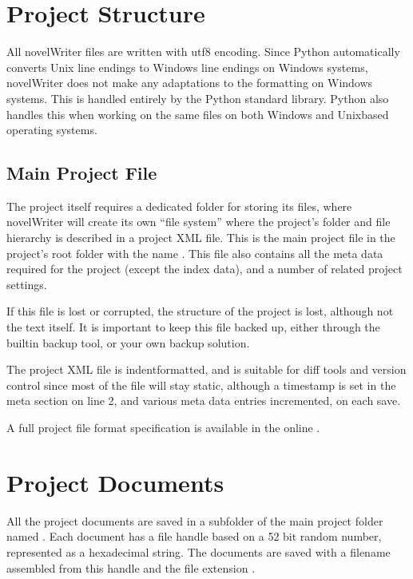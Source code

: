 \documentclass[a4paper,11pt,english]{sphinxmanual}
\begin{document}
\section{Project Structure}
\label{\detokenize{tech_storage:project-structure}}
\sphinxAtStartPar
All novelWriter files are written with utf\sphinxhyphen{}8 encoding. Since Python automatically converts Unix
line endings to Windows line endings on Windows systems, novelWriter does not make any adaptations
to the formatting on Windows systems. This is handled entirely by the Python standard library.
Python also handles this when working on the same files on both Windows and Unix\sphinxhyphen{}based operating
systems.


\subsection{Main Project File}
\label{\detokenize{tech_storage:main-project-file}}
\sphinxAtStartPar
The project itself requires a dedicated folder for storing its files, where novelWriter will create
its own “file system” where the project’s folder and file hierarchy is described in a project XML
file. This is the main project file in the project’s root folder with the name .
This file also contains all the meta data required for the project (except the index data), and a
number of related project settings.

\sphinxAtStartPar
If this file is lost or corrupted, the structure of the project is lost, although not the text
itself. It is important to keep this file backed up, either through the built\sphinxhyphen{}in backup tool, or
your own backup solution.

\sphinxAtStartPar
The project XML file is indent\sphinxhyphen{}formatted, and is suitable for diff tools and version control since
most of the file will stay static, although a timestamp is set in the meta section on line 2, and
various meta data entries incremented, on each save.

\sphinxAtStartPar
A full project file format specification is available in the online .


\section{Project Documents}
\label{\detokenize{tech_storage:project-documents}}
\sphinxAtStartPar
All the project documents are saved in a subfolder of the main project folder named .
Each document has a file handle based on a 52 bit random number, represented as a hexadecimal
string. The documents are saved with a filename assembled from this handle and the file extension
.
\end{document}
